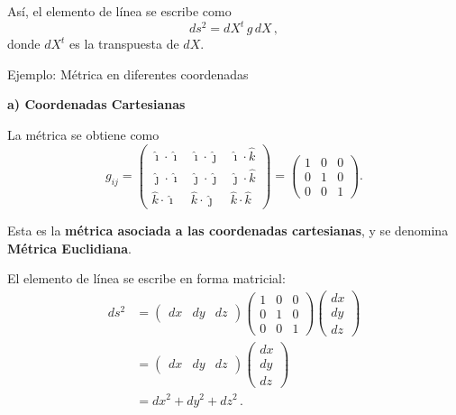 \documentclass[../apunte_mecanica_clasica.tex]{subfiles}%
\begin{document}
Así, el elemento de línea se escribe como
\begin{equation*}
    ds^2 = dX^t \, g \, dX \,,
\end{equation*}
donde $dX^t$ es la transpuesta de $dX$.

\begin{apuntebloque}{Ejemplo: Métrica en diferentes coordenadas}

\textbf{a) Coordenadas Cartesianas}

La métrica se obtiene como
\begin{equation*}
    g_{ij} =
    \begin{pmatrix}
        \hat{\imath}\!\cdot\!\hat{\imath} & \hat{\imath}\!\cdot\!\hat{\jmath} & \hat{\imath}\!\cdot\!\hat{k} \\
        \hat{\jmath}\!\cdot\!\hat{\imath} & \hat{\jmath}\!\cdot\!\hat{\jmath} & \hat{\jmath}\!\cdot\!\hat{k} \\
        \hat{k}\!\cdot\!\hat{\imath} & \hat{k}\!\cdot\!\hat{\jmath} & \hat{k}\!\cdot\!\hat{k}
    \end{pmatrix}
    =
    \begin{pmatrix}
        1 & 0 & 0 \\
        0 & 1 & 0 \\
        0 & 0 & 1
    \end{pmatrix}.
\end{equation*}

Esta es la \textbf{métrica asociada a las coordenadas cartesianas}, y se denomina
\textbf{Métrica Euclidiana}.  

El elemento de línea se escribe en forma matricial:
\begin{align*}
    ds^2 &= 
    \begin{pmatrix}
        dx & dy & dz
    \end{pmatrix}
    \begin{pmatrix}
        1 & 0 & 0 \\
        0 & 1 & 0 \\
        0 & 0 & 1
    \end{pmatrix}
    \begin{pmatrix}
        dx \\ dy \\ dz
    \end{pmatrix} \\[4pt]
    &= 
    \begin{pmatrix}
        dx & dy & dz
    \end{pmatrix}
    \begin{pmatrix}
        dx \\ dy \\ dz
    \end{pmatrix} \\[4pt]
    &= dx^2 + dy^2 + dz^2 \,.
\end{align*}


\end{apuntebloque}
\end{document}
